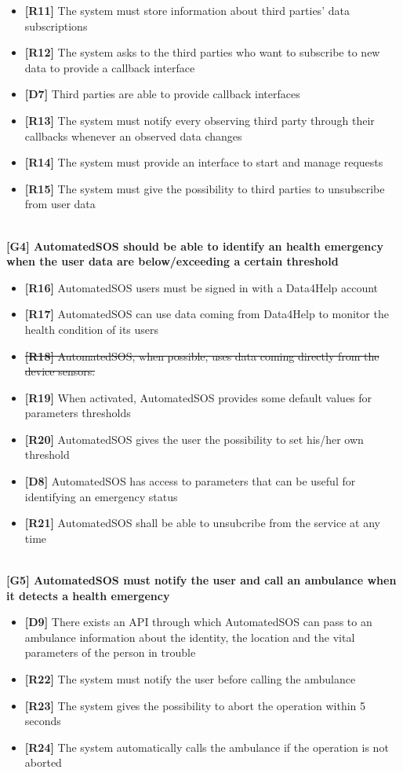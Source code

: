 \begin{itemize}
	\item \textbf{[R11]} The system must store information about third parties' data subscriptions
	\item \textbf{[R12]} The system asks to the third parties who want to subscribe to new data to provide a callback interface
	\item \textbf{[D7]} Third parties are able to provide callback interfaces
	\item \textbf{[R13]} The system must notify every observing third party through their callbacks whenever an observed data changes
	\item \textbf{[R14]} The system must provide an interface to start and manage requests
	\item \textbf{[R15]} The system must give the possibility to third parties to unsubscribe from user data
\end{itemize}
\\
\textbf{[G4] AutomatedSOS should be able to identify an health emergency when the user data are below/exceeding a certain threshold}
\begin{itemize}
	\item \textbf{[R16]} AutomatedSOS users must be signed in with a Data4Help account
	\item \textbf{[R17]} AutomatedSOS can use data coming from Data4Help to monitor the health condition of its users
	\item \sout{\textbf{[R18]} AutomatedSOS, when possible, uses data coming directly from the device sensors.}
	\item \textbf{[R19]} When activated, AutomatedSOS provides some default values for parameters thresholds
	\item \textbf{[R20]} AutomatedSOS gives the user the possibility to set his/her own threshold 
	\item \textbf{[D8]} AutomatedSOS has access to parameters that can be useful for identifying an emergency status
	\item \textbf{[R21]} AutomatedSOS shall be able to unsubcribe from the service at any time
\end{itemize}
\\
\textbf{[G5] AutomatedSOS must notify the user and call an ambulance when it detects a health emergency}
\begin{itemize}
	\item \textbf{[D9]} There exists an API through which AutomatedSOS can pass to an ambulance information about the identity, the location and the vital parameters of the person in trouble
	\item \textbf{[R22]} The system must notify the user before calling the ambulance
	\item \textbf{[R23]} The system gives the possibility to abort the operation within 5 seconds
	\item \textbf{[R24]} The system automatically calls the ambulance if the operation is not aborted
\end{itemize}
